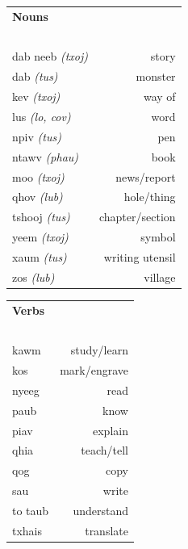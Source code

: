 \documentclass{article}
\begin{document}
\begin{multicols}{2}
[
\section*{}
]

\begin{tabular}{l r}
\textbf{Nouns} \\
~\\
dab neeb {\em (txoj)} &story\\
dab {\em (tus)} &monster\\
kev {\em (txoj)} &way of\\
lus {\em (lo, cov)} &word\\
npiv {\em (tus)} &pen\\
ntawv {\em (phau)} &book\\
moo {\em (txoj)} &news/report\\
qhov {\em (lub)} &hole/thing\\
tshooj {\em (tus)} &chapter/section\\
yeem {\em (txoj)} &symbol\\
xaum {\em (tus)} &writing utensil\\
zos {\em (lub)} &village\\
\end{tabular}

\begin{tabular}{l r}
\textbf{Verbs} \\
~\\
kawm &study/learn\\
kos &mark/engrave\\
nyeeg &read\\
paub &know\\
piav &explain\\
qhia &teach/tell\\
qog &copy\\
sau &write\\
to taub &understand\\
txhais &translate\\
\end{tabular}
\end{multicols}

\clearpage
\end{document}
